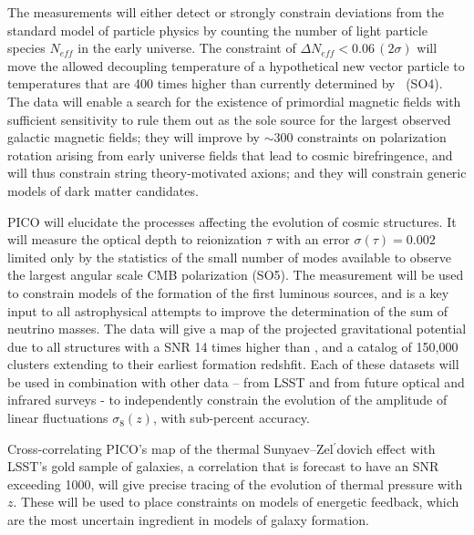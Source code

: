 \documentclass[PICOReport.tex]{subfiles}
\begin{document}
The measurements will either detect or strongly constrain deviations from the standard model of particle physics by counting the number of light particle species $N_{eff}$ in the early universe.  The constraint of $\Delta N_{eff} < 0.06 \, (2\sigma)$ will move the allowed decoupling temperature of a hypothetical new vector particle to temperatures that are 400 times higher than currently determined by \planck\ (SO4). 
The data will enable a search for the existence of primordial magnetic fields with sufficient sensitivity to rule them out as the sole source for the largest observed galactic magnetic fields; they will improve by $\sim$300 constraints on polarization rotation arising from early universe fields that lead to cosmic birefringence, and will thus constrain string theory-motivated axions; and they will constrain generic models of dark matter candidates. 

PICO will elucidate the processes affecting the evolution of cosmic structures. It will measure the optical depth to reionization $\tau$ with an error $\sigma(\tau) = 0.002$ limited only by the statistics of the small number of modes available to observe the largest angular scale CMB polarization (SO5). The measurement will be used to constrain models of the formation of the first luminous sources, and is a key input to all astrophysical attempts to improve the determination of the sum of neutrino masses. The data will give a map of the projected gravitational potential due to all structures with a \ac{SNR} 14 times higher than \planck , and a catalog of 150,000 clusters extending to their earliest formation redshfit. Each of these datasets will be used in combination with other data -- from LSST and from future optical and infrared surveys - to independently constrain the evolution of the amplitude of linear fluctuations $\sigma_{8}(z)$, with sub-percent accuracy.  

Cross-correlating PICO's map of the thermal Sunyaev--Zel$^{\prime}$dovich effect with LSST's gold sample of galaxies, a correlation that is forecast to have an \ac{SNR} exceeding 1000, will give precise tracing of the evolution of thermal pressure with $z$. These will be used to place constraints on models of energetic feedback, which are the most uncertain ingredient in models of galaxy formation. 
\end{document}
